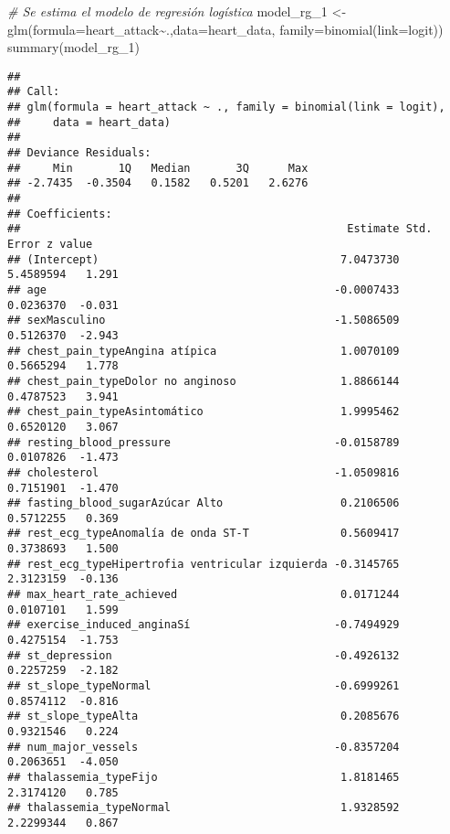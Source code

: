 \documentclass[
]{article}
\newenvironment{Shaded}{\begin{snugshade}}{\end{snugshade}}
\newcommand{\AttributeTok}[1]{\textcolor[rgb]{0.77,0.63,0.00}{#1}}
\newcommand{\CommentTok}[1]{\textcolor[rgb]{0.56,0.35,0.01}{\textit{#1}}}
\newcommand{\FunctionTok}[1]{\textcolor[rgb]{0.00,0.00,0.00}{#1}}
\newcommand{\NormalTok}[1]{#1}
\newcommand{\OtherTok}[1]{\textcolor[rgb]{0.56,0.35,0.01}{#1}}
\newcommand{\SpecialCharTok}[1]{\textcolor[rgb]{0.00,0.00,0.00}{#1}}
\begin{document}
\begin{Shaded}
\begin{Highlighting}[]
\CommentTok{\# Se estima el modelo de regresión logística}
\NormalTok{model\_rg\_1 }\OtherTok{\textless{}{-}} \FunctionTok{glm}\NormalTok{(}\AttributeTok{formula=}\NormalTok{heart\_attack}\SpecialCharTok{\textasciitilde{}}\NormalTok{.,}\AttributeTok{data=}\NormalTok{heart\_data, }
                  \AttributeTok{family=}\FunctionTok{binomial}\NormalTok{(}\AttributeTok{link=}\NormalTok{logit))}
\FunctionTok{summary}\NormalTok{(model\_rg\_1)}
\end{Highlighting}
\end{Shaded}

\begin{verbatim}
## 
## Call:
## glm(formula = heart_attack ~ ., family = binomial(link = logit), 
##     data = heart_data)
## 
## Deviance Residuals: 
##     Min       1Q   Median       3Q      Max  
## -2.7435  -0.3504   0.1582   0.5201   2.6276  
## 
## Coefficients:
##                                                  Estimate Std. Error z value
## (Intercept)                                     7.0473730  5.4589594   1.291
## age                                            -0.0007433  0.0236370  -0.031
## sexMasculino                                   -1.5086509  0.5126370  -2.943
## chest_pain_typeAngina atípica                   1.0070109  0.5665294   1.778
## chest_pain_typeDolor no anginoso                1.8866144  0.4787523   3.941
## chest_pain_typeAsintomático                     1.9995462  0.6520120   3.067
## resting_blood_pressure                         -0.0158789  0.0107826  -1.473
## cholesterol                                    -1.0509816  0.7151901  -1.470
## fasting_blood_sugarAzúcar Alto                  0.2106506  0.5712255   0.369
## rest_ecg_typeAnomalía de onda ST-T              0.5609417  0.3738693   1.500
## rest_ecg_typeHipertrofia ventricular izquierda -0.3145765  2.3123159  -0.136
## max_heart_rate_achieved                         0.0171244  0.0107101   1.599
## exercise_induced_anginaSí                      -0.7494929  0.4275154  -1.753
## st_depression                                  -0.4926132  0.2257259  -2.182
## st_slope_typeNormal                            -0.6999261  0.8574112  -0.816
## st_slope_typeAlta                               0.2085676  0.9321546   0.224
## num_major_vessels                              -0.8357204  0.2063651  -4.050
## thalassemia_typeFijo                            1.8181465  2.3174120   0.785
## thalassemia_typeNormal                          1.9328592  2.2299344   0.867

\end{verbatim}
\end{document}

